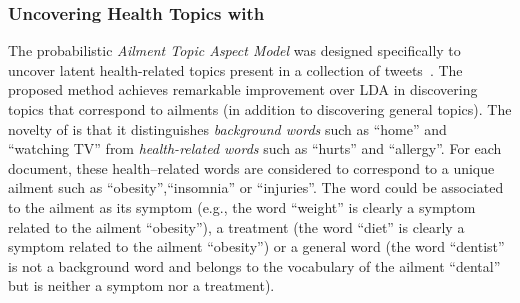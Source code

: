\subsubsection{Uncovering Health Topics with \atam}
The probabilistic \emph{Ailment Topic Aspect Model} was designed 
specifically to uncover latent health-related topics present in a 
collection of tweets~\cite{atam2}. The proposed method achieves
remarkable improvement over LDA in discovering topics that correspond to 
ailments (in addition to discovering general topics). The novelty 
of \atam is that it distinguishes {\em background words} 
such as ``home'' and ``watching TV'' from {\em health-related words} 
such as ``hurts'' and ``allergy''. For each document, 
these health--related words are considered to correspond to a unique 
ailment such as ``obesity'',``insomnia'' or ``injuries''.
The word could be associated to the ailment as its symptom 
(e.g., the word ``weight'' is clearly a symptom related to the ailment
``obesity''), a treatment (the word ``diet'' is clearly a symptom
related to the ailment ``obesity'') or a general word (the word
``dentist'' is not a background word and belongs to the vocabulary of
the ailment ``dental'' but is neither a symptom nor a treatment).


